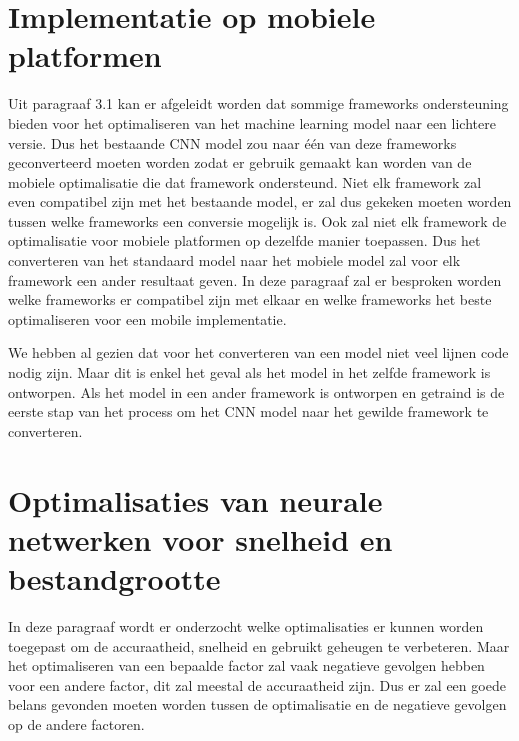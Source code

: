 \section{Implementatie op mobiele platformen}
Uit paragraaf 3.1 kan er afgeleidt worden dat sommige frameworks ondersteuning bieden voor het optimaliseren van het machine learning model naar een lichtere versie.
Dus het bestaande CNN model zou naar \'e\'en van deze frameworks geconverteerd moeten worden zodat er gebruik gemaakt kan worden van de mobiele optimalisatie die dat framework ondersteund.
Niet elk framework zal even compatibel zijn met het bestaande model, er zal dus gekeken moeten worden tussen welke frameworks een conversie mogelijk is.
Ook zal niet elk framework de optimalisatie voor mobiele platformen op dezelfde manier toepassen.
Dus het converteren van het standaard model naar het mobiele model zal voor elk framework een ander resultaat geven.
In deze paragraaf zal er besproken worden welke frameworks er compatibel zijn met elkaar en welke frameworks het beste optimaliseren voor een mobile implementatie.

We hebben al gezien dat voor het converteren van een model niet veel lijnen code nodig zijn. 
Maar dit is enkel het geval als het model in het zelfde framework is ontworpen.
Als het model in een ander framework is ontworpen en getraind is de eerste stap van het process om het CNN model naar het gewilde framework te converteren.


\section{Optimalisaties van neurale netwerken voor snelheid en bestandgrootte}
In deze paragraaf wordt er onderzocht welke optimalisaties er kunnen worden toegepast om de accuraatheid, snelheid en gebruikt geheugen te verbeteren.
Maar het optimaliseren van een bepaalde factor zal vaak negatieve gevolgen hebben voor een andere factor, dit zal meestal de accuraatheid zijn.
Dus er zal een goede belans gevonden moeten worden tussen de optimalisatie en de negatieve gevolgen op de andere factoren.


